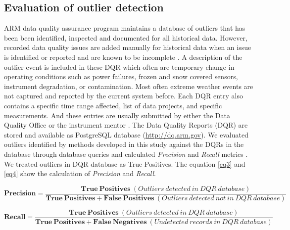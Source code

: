 \subsection{Evaluation of outlier detection}
ARM data quality assurance program maintains a database of outliers that
has been been identified, inspected and documented for all historical
data. However, recorded data quality
issues are added manually for historical data when an issue is
identified or reported and are known to be incomplete \cite{mccord2016arm}. 
A description of the outlier event is included in these DQR which often
are temporary change in operating conditions such as power failures, frozen 
and snow covered sensors, instrument degradation, or contamination. 
Most often extreme weather events are not captured and reported by the
current system before. Each DQR entry also contains a specific time range affected, 
list of data projects, and specific measurements. And these entries 
are usually submitted by either the Data Quality Office \cite{peppler2016arm} 
or the instrument mentor \cite{cress2016deploying}. 
The Data Quality Reports (DQR) are stored and available as PostgreSQL
database (\url{http://dq.arm.gov}). 
We evaluated outliers
identified by methods developed in this study against the DQRs in the
database through database queries and calculated \textit{Precision} and \textit{Recall}
metrics \cite{perry1955machine}. We treated outliers in DQR database as True Positives. 
The equation \ref{eq3} and \ref{eq4} show the calculation of \textit{Precision} and \textit{Recall}.

\begin{table}[ht]
\begin{equation}\label{eq3}
\mathbf{Precision} = \frac{\mathbf{True\ Positives}\ (Outliers\ detected\ in\ DQR\ database)}{\mathbf{True\ Positives + False\ Positives}\ (Outliers\ detected\ not\ in\ DQR\ database)}
\end{equation}

\begin{equation}\label{eq4}
\mathbf{Recall} = \frac{\mathbf{True\ Positives}\ (Outliers\ detected\ in\ DQR\ database)}{\mathbf{True\ Positives + False\ Negatives}\ (Undetected\ records\ in\ DQR\ database)}
\end{equation}
\end{table}

